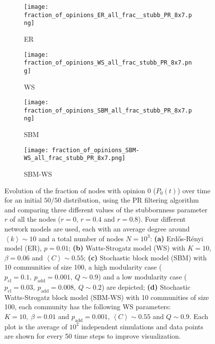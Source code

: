 \documentclass[11 pt , letterpaper , twoside , openright]{book}
\begin{document}
\begin{figure}[H]
  \begin{subfigure}[b]{0.49\textwidth}
  	\texttt{[image: fraction\_of\_opinions\_ER\_all\_frac\_\_stubb\_PR\_8x7.png]}
    \caption{ER}
  \end{subfigure}
  \begin{subfigure}[b]{0.49\textwidth}
  	\texttt{[image: fraction\_of\_opinions\_WS\_all\_frac\_stubb\_PR\_8x7.png]}
    \caption{WS}
  \end{subfigure}
  \begin{subfigure}[b]{0.49\textwidth}
    \texttt{[image: fraction\_of\_opinions\_SBM\_all\_frac\_stubb\_PR\_8x7.png]}
    \caption{SBM}
  \end{subfigure}
  \begin{subfigure}[b]{0.49\textwidth}
    \texttt{[image: fraction\_of\_opinions\_SBM-WS\_all\_frac\_stubb\_PR\_8x7.png]}
    \caption{SBM-WS}
  \end{subfigure}
  \captionsetup{format=plain}
  \caption[Evolution of the fraction of nodes with opinion 0 ($P_0(t)$) over time for an initial $50/50$ opinion distribution, using the PR filtering algorithm and comparing three different values of the stubbornness parameter $r$ of all the nodes ($r = 0$, $r = 0.4$ and $r = 0.8$).]{Evolution of the fraction of nodes with opinion 0 ($P_0(t)$) over time for an initial $50/50$ distribution, using the PR filtering algorithm and comparing three different values of the stubbornness parameter $r$ of all the nodes ($r = 0$, $r = 0.4$ and $r = 0.8$). Four different network models are used, each with an average degree around $\left<k\right> \sim 10$ and a total number of nodes $N = 10^3$: \textbf{(a)} Erd\H{o}s-R\'{e}nyi model (ER), $p=0.01$; \textbf{(b)} Watts-Strogatz model (WS) with $K = 10$, $\beta = 0.06$ and $\left<C\right> \sim 0.55$; \textbf{(c)} Stochastic block model (SBM) with 10 communities of size 100, a high modularity case ($p_{\text{cl}} = 0.1,\ p_{\text{add}} = 0.001,\ Q \sim 0.9$) and a low modularity case ($p_{\text{cl}} = 0.03,\ p_{\text{add}} = 0.008,\ Q \sim 0.2$) are depicted; \textbf{(d)} Stochastic Watts-Strogatz block model (SBM-WS) with 10 communities of size 100, each community has the following WS parameters: $K = 10,\ \beta = 0.01$ and $p_{\text{add}} = 0.001$, $\left<C\right> \sim 0.55$ and $Q \sim 0.9$. Each plot is the average of $10^2$ independent simulations and data points are shown for every 50 time steps to improve visualization.}%
\label{ev_op_50_50_all_frac_stubb_PR}
\end{figure}
\end{document}
